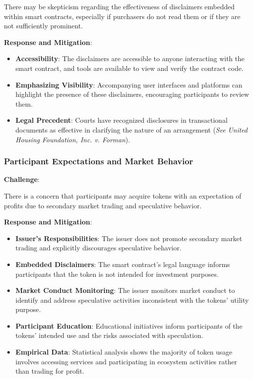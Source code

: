 \documentclass[a4paper,12pt]{article}
\begin{document}
There may be skepticism regarding the effectiveness of disclaimers embedded within smart contracts, especially if purchasers do not read them or if they are not sufficiently prominent.

\textbf{Response and Mitigation}:

\begin{itemize}
\item \textbf{Accessibility}: The disclaimers are accessible to anyone interacting with the smart contract, and tools are available to view and verify the contract code.
\item \textbf{Emphasizing Visibility}: Accompanying user interfaces and platforms can highlight the presence of these disclaimers, encouraging participants to review them.
\item \textbf{Legal Precedent}: Courts have recognized disclosures in transactional documents as effective in clarifying the nature of an arrangement (\emph{See United Housing Foundation, Inc. v. Forman}).
\end{itemize}

\subsubsection{Participant Expectations and Market Behavior}
\textbf{Challenge}:

There is a concern that participants may acquire tokens with an expectation of profits due to secondary market trading and speculative behavior.

\textbf{Response and Mitigation}:

\begin{itemize}
\item \textbf{Issuer's Responsibilities}: The issuer does not promote secondary market trading and explicitly discourages speculative behavior.
\item \textbf{Embedded Disclaimers}: The smart contract's legal language informs participants that the token is not intended for investment purposes.
\item \textbf{Market Conduct Monitoring}: The issuer monitors market conduct to identify and address speculative activities inconsistent with the tokens' utility purpose.
\item \textbf{Participant Education}: Educational initiatives inform participants of the tokens' intended use and the risks associated with speculation.
\item \textbf{Empirical Data}: Statistical analysis shows the majority of token usage involves accessing services and participating in ecosystem activities rather than trading for profit.
\end{itemize}
\end{document}
